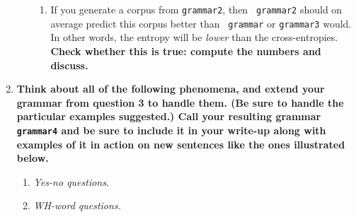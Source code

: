 \documentclass[10pt]{article}
\begin{document}
\begin{enumerate}
\begin{enumerate}
\begin{enumerate}
\item If you generate a corpus from {\tt grammar2}, then {\tt
    grammar2} should on average predict this corpus better than {\tt
    grammar} or {\tt grammar3} would. In other words, the entropy will
  be {\it lower} than the cross-entropies. {\bf Check whether this is true:
    compute the numbers and discuss.} \end{enumerate}
\end{enumerate}

\item  {\bf Think about all of the following phenomena, and extend your grammar
  from question 3 to handle them. (Be sure to handle the particular
  examples suggested.)  Call your resulting grammar
  \verb|grammar4| and be sure to include it in your write-up along with examples of it
  in action on new sentences like the ones illustrated below.}

\begin{enumerate}

I have included sample outputs from the grammar below. I also tested to ensure all of the sentences and test case presented in the assignment pass. You can see the test case file in {\tt test.rb} in my source distribution. You can easily see if everything passes by running:

{\tt ./test.rb | grep failure}

\item {\it Yes-no questions}.

\item {\it WH-word questions.} 

\end{enumerate}
\end{enumerate}
\end{document}
